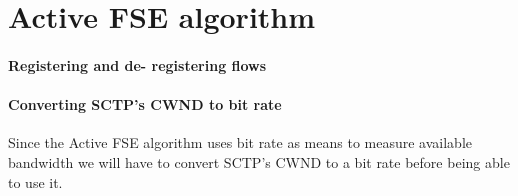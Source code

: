 \section{Active FSE algorithm}
\paragraph{Registering and de- registering flows}


\paragraph{Converting SCTP's CWND to bit rate}
Since the Active FSE algorithm uses bit rate as means to measure available bandwidth we will have to convert SCTP's CWND to a bit rate before being able to use it. 

